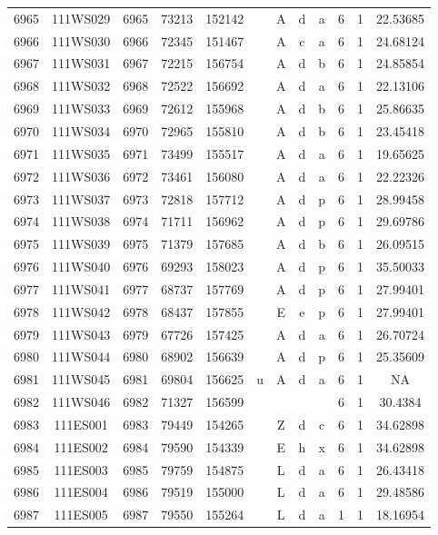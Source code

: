\begin{tabular}{|*{12}{c|}}
6965 & 111WS029 & 6965 & 73213 & 152142 &  & A & d & a & 6 & 1 & 22.53685 \\ 
6966 & 111WS030 & 6966 & 72345 & 151467 &  & A & c & a & 6 & 1 & 24.68124 \\ 
6967 & 111WS031 & 6967 & 72215 & 156754 &  & A & d & b & 6 & 1 & 24.85854 \\ 
6968 & 111WS032 & 6968 & 72522 & 156692 &  & A & d & a & 6 & 1 & 22.13106 \\ 
6969 & 111WS033 & 6969 & 72612 & 155968 &  & A & d & b & 6 & 1 & 25.86635 \\ 
6970 & 111WS034 & 6970 & 72965 & 155810 &  & A & d & b & 6 & 1 & 23.45418 \\ 
6971 & 111WS035 & 6971 & 73499 & 155517 &  & A & d & a & 6 & 1 & 19.65625 \\ 
6972 & 111WS036 & 6972 & 73461 & 156080 &  & A & d & a & 6 & 1 & 22.22326 \\ 
6973 & 111WS037 & 6973 & 72818 & 157712 &  & A & d & p & 6 & 1 & 28.99458 \\ 
6974 & 111WS038 & 6974 & 71711 & 156962 &  & A & d & p & 6 & 1 & 29.69786 \\ 
6975 & 111WS039 & 6975 & 71379 & 157685 &  & A & d & b & 6 & 1 & 26.09515 \\ 
6976 & 111WS040 & 6976 & 69293 & 158023 &  & A & d & p & 6 & 1 & 35.50033 \\ 
6977 & 111WS041 & 6977 & 68737 & 157769 &  & A & d & p & 6 & 1 & 27.99401 \\ 
6978 & 111WS042 & 6978 & 68437 & 157855 &  & E & e & p & 6 & 1 & 27.99401 \\ 
6979 & 111WS043 & 6979 & 67726 & 157425 &  & A & d & a & 6 & 1 & 26.70724 \\ 
6980 & 111WS044 & 6980 & 68902 & 156639 &  & A & d & p & 6 & 1 & 25.35609 \\ 
6981 & 111WS045 & 6981 & 69804 & 156625 & u & A & d & a & 6 & 1 & NA \\ 
6982 & 111WS046 & 6982 & 71327 & 156599 &  &  &  &  & 6 & 1 & 30.4384 \\ 
6983 & 111ES001 & 6983 & 79449 & 154265 &  & Z & d & c & 6 & 1 & 34.62898 \\ 
6984 & 111ES002 & 6984 & 79590 & 154339 &  & E & h & x & 6 & 1 & 34.62898 \\ 
6985 & 111ES003 & 6985 & 79759 & 154875 &  & L & d & a & 6 & 1 & 26.43418 \\ 
6986 & 111ES004 & 6986 & 79519 & 155000 &  & L & d & a & 6 & 1 & 29.48586 \\ 
6987 & 111ES005 & 6987 & 79550 & 155264 &  & L & d & a & 1 & 1 & 18.16954 \\ 

\end{tabular}
